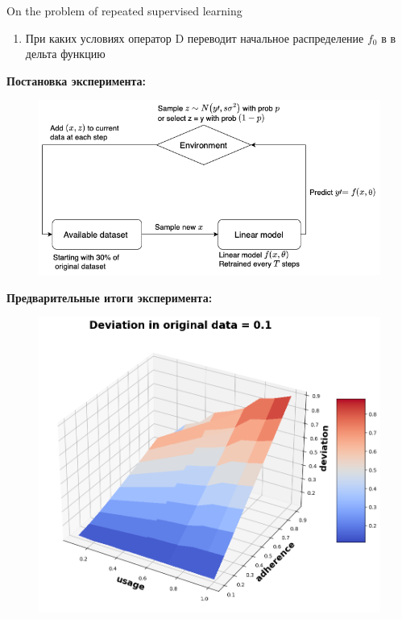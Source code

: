\documentclass[10pt]{beamer}
\begin{document}
\begin{frame}{On the problem of repeated supervised learning}
\begin{minipage}[t]{0.44\textwidth}
\begin{enumerate}
                \item При каких условиях оператор $\text{D}$ переводит начальное распределение $f_0$ в в дельта функцию
            \end{enumerate}
        \end{minipage}
        \hfill
        \begin{minipage}[t]{0.53\textwidth} 
            \textbf{Постановка эксперимента:}
            \begin{figure}
                \centering
                \includegraphics[scale=0.2]{pictures/Experiment_setup.png}
                \label{ex_setup}
            \end{figure}
            \textbf{Предварительные итоги эксперимента:}
            \begin{figure}
                \centering
                \includegraphics[scale=0.19]{pictures/3D plot.png}

\end{figure}
\end{minipage}
\end{frame}
\end{document}
